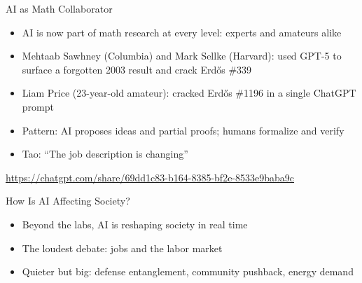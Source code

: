 \documentclass[aspectratio=169]{beamer}
\begin{document}
\begin{frame}{AI as Math Collaborator}
    \begin{itemize}
        \item AI is now part of math research at every level: experts and amateurs alike
        \vspace{0.5em}
        \item Mehtaab Sawhney (Columbia) and Mark Sellke (Harvard): used GPT-5 to surface a forgotten 2003 result and crack Erd\H{o}s \#339
        \vspace{0.5em}
        \item Liam Price (23-year-old amateur): cracked Erd\H{o}s \#1196 in a single ChatGPT prompt
        \vspace{0.5em}
        \item Pattern: AI proposes ideas and partial proofs; humans formalize and verify
        \vspace{0.5em}
        \item Tao: ``The job description is changing''
    \end{itemize}
    \vspace{0.4em}
    \footnotesize \url{https://chatgpt.com/share/69dd1c83-b164-8385-bf2e-8533e9baba9c}
\end{frame}


\begin{frame}{How Is AI Affecting Society?}
    \begin{itemize}
        \item Beyond the labs, AI is reshaping society in real time
        \vspace{0.5em}
        \item The loudest debate: jobs and the labor market
        \vspace{0.5em}
        \item Quieter but big: defense entanglement, community pushback, energy demand
    \end{itemize}
\end{frame}
\end{document}

